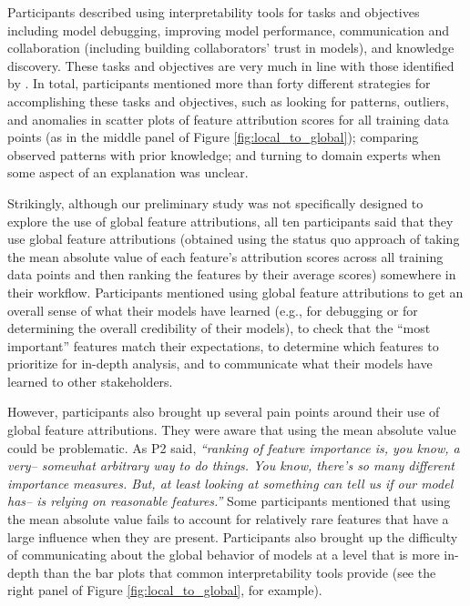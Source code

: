 \documentclass[11pt,dvipdfmx]{article}
\begin{document}
Participants described using interpretability tools for tasks and
objectives including model debugging, improving model performance,
communication and collaboration (including building collaborators'
trust in models), and knowledge discovery.  These tasks and objectives
are very much in line with those identified by \citet{Hullman}. In
total, participants mentioned more than forty different strategies for
accomplishing these tasks and objectives, such as looking for
patterns, outliers, and anomalies in scatter plots of feature
attribution scores for all training data points (as in the middle
panel of Figure \ref{fig:local_to_global}); comparing observed
patterns with prior knowledge; and turning to domain experts when some
aspect of an explanation was unclear.

Strikingly, although our preliminary study was not specifically
designed to explore the use of global feature attributions, all ten
participants said that they use global feature attributions (obtained using
the status quo approach of taking the mean absolute value of each
feature's attribution scores across all training data points and then
ranking the features by their average scores) somewhere in their
workflow.  Participants mentioned using global feature attributions to get an
overall sense of what their models have learned (e.g., for debugging
or for determining the overall credibility of their models), to check
that the ``most important'' features match their expectations, to
determine which features to prioritize for in-depth analysis, and to
communicate what their models have learned to other stakeholders.

However, participants also brought up several pain points around their
use of global feature attributions.  They were aware that using the mean
absolute value could be problematic.  As P2 said, \textit{``ranking of
  feature importance is, you know, a very-- somewhat arbitrary way to
  do things. You know, there's so many different importance
  measures. But, at least looking at something can tell us if our
  model has-- is relying on reasonable features.''}  Some participants
mentioned that using the mean absolute value fails to account for
relatively rare features that have a large influence when they are
present.  Participants also brought up the difficulty of communicating
about the global behavior of models at a level that is more in-depth
than the bar plots that common interpretability tools provide (see the
right panel of Figure \ref{fig:local_to_global}, for example).
\end{document}
